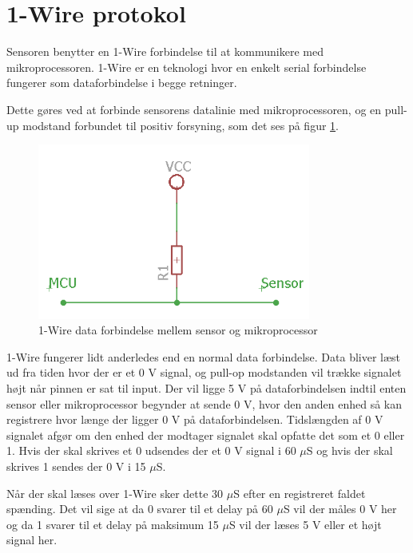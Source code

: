 \section{1-Wire protokol}
Sensoren benytter en 1-Wire forbindelse til at kommunikere med mikroprocessoren. 1-Wire er en teknologi hvor en  enkelt serial forbindelse fungerer som dataforbindelse i begge retninger. 

Dette gøres ved at forbinde sensorens datalinie med mikroprocessoren, og en pull-up modstand forbundet til positiv forsyning, som det ses på figur \ref{one_wire_schematic}. 


\begin{figure}[h!]
  \centering
  \includegraphics[width=0.8\textwidth]{figures/onewire_eksempel.png}
  \caption{1-Wire data forbindelse mellem sensor og mikroprocessor}
  \label{one_wire_schematic}
\end{figure}

1-Wire fungerer lidt anderledes end en normal data forbindelse. Data bliver læst ud fra tiden hvor der er et 0 V signal, og pull-op modstanden vil trække signalet højt når pinnen er sat til input. Der vil ligge 5 V på dataforbindelsen indtil enten sensor eller mikroprocessor begynder at sende 0 V, hvor den anden enhed så kan registrere hvor længe der ligger 0 V på dataforbindelsen. Tidslængden af 0 V signalet afgør om den enhed der modtager signalet skal opfatte det som et 0 eller 1. Hvis der skal skrives et 0 udsendes der et 0 V signal i 60 $\mu$S og hvis der skal skrives 1 sendes der 0 V i 15 $\mu$S. 

Når der skal læses over 1-Wire sker dette 30 $\mu$S efter en registreret faldet spænding. Det vil sige at da 0 svarer til et delay på 60 $\mu$S vil der måles 0 V her og da 1 svarer til et delay på maksimum 15 $\mu$S vil der læses 5 V eller et højt signal her.


